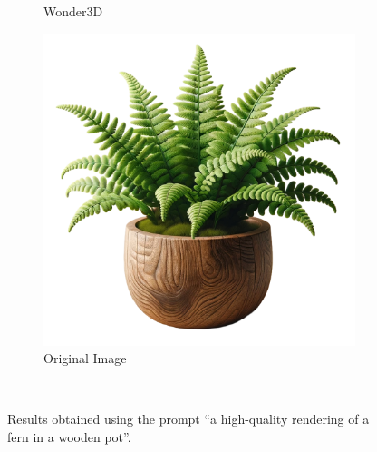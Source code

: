 \begin{figure}[ht]
\begin{subfigure}[b]{0.27\textwidth}
        \caption{Wonder3D}
        \vspace{0.1cm}
    \end{subfigure}
    \begin{subfigure}[b]{0.28\textwidth}
        \centering
        \includegraphics[width=\textwidth]{etc/Images/fern.png}
        \caption{Original Image}
        \vspace{0.1cm}
    \end{subfigure}
    \caption{Results obtained using the prompt ``a high-quality rendering of a fern in a wooden pot''.}~\label{fig:resultFern}
\end{figure}



